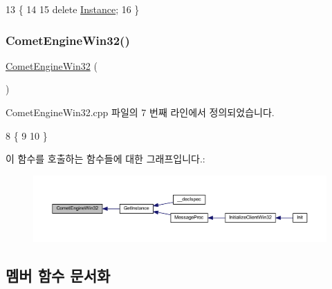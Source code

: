 \begin{DoxyCode}
13 \{
14 
15     \textcolor{keyword}{delete} \hyperlink{class_comet_engine_1_1_comet_engine_win32_ac980c50873d6df828203b639e543de14}{Instance};
16 \}
\end{DoxyCode}
\mbox{\label{class_comet_engine_1_1_comet_engine_win32_a62369ca325b16b42ad77a4f1523e4356}} 
\subsubsection{\texorpdfstring{Comet\+Engine\+Win32()}{CometEngineWin32()}}
{\footnotesize\ttfamily \hyperlink{class_comet_engine_1_1_comet_engine_win32}{Comet\+Engine\+Win32} (\begin{DoxyParamCaption}{ }\end{DoxyParamCaption})\hspace{0.3cm}{\ttfamily [private]}}



Comet\+Engine\+Win32.\+cpp 파일의 7 번째 라인에서 정의되었습니다.


\begin{DoxyCode}
8 \{
9 
10 \}
\end{DoxyCode}
이 함수를 호출하는 함수들에 대한 그래프입니다.\+:\nopagebreak
\begin{figure}[H]
\begin{center}
\leavevmode
\includegraphics[width=350pt]{class_comet_engine_1_1_comet_engine_win32_a62369ca325b16b42ad77a4f1523e4356_icgraph}
\end{center}
\end{figure}


\subsection{멤버 함수 문서화}
\mbox{\label{class_comet_engine_1_1_comet_engine_win32_af96d04b2fa84467a5342e290690e40fb}} 
